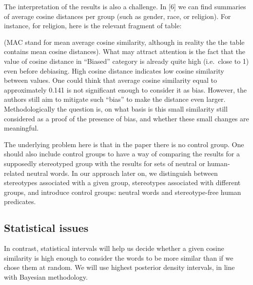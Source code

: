 \documentclass[
  10pt,
  dvipsnames,enabledeprecatedfontcommands, twocolumn]{scrartcl}
\begin{document}
The interpretation of the results is also a challenge. In {[}6{]} we can
find summaries of average cosine distances per group (such as gender,
race, or religion). For instance, for religion, here is the relevant
fragment of table:


\noindent (MAC stand for mean average cosine similarity, although in
reality the the table contains mean cosine distances). What may attract
attention is the fact that the value of cosine distance in ``Biased''
category is already quite high (i.e.~close to 1) even before debiasing.
High cosine distance indicates low cosine similarity between values. One
could think that average cosine similarity equal to approximately 0.141
is not significant enough to consider it as bias. However, the authors
still aim to mitigate such ``bias'' to make the distance even larger.
Methodologically the question is, on what basis is this small similarity
still considered as a proof of the presence of bias, and whether these
small changes are meaningful.

The underlying problem here is that in the paper there is no control
group. One should also include control groups to have a way of comparing
the results for a supposedly stereotyped group with the results for sets
of neutral or human-related neutral words. In our approach later on, we
distinguish between stereotypes associated with a given group,
stereotypes associated with different groups, and introduce control
groups: neutral words and stereotype-free human predicates.




\hypertarget{statistical-issues}{%
\subsection{Statistical issues}\label{statistical-issues}}

In contrast, statistical intervals will help us decide whether a given
cosine similarity is high enough to consider the words to be more
similar than if we chose them at random. We will use highest posterior
density intervals, in line with Bayesian methodology.
\end{document}
